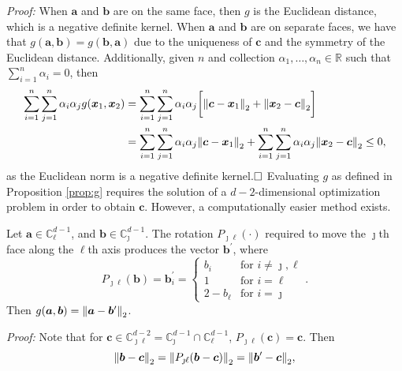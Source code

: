 {\em Proof:}
When $\bm{a}$ and $\bm{b}$ are on the same face, then $g$ is the Euclidean distance, which is a 
  negative definite kernel.  When $\bm{a}$ and $\bm{b}$ are on separate
  faces, we have that $g(\bm{a}, \bm{b}) = g(\bm{b}, \bm{a})$ due to the uniqueness of $\bm{c}$ and the symmetry of the Euclidean distance. Additionally, given $n$ and  collection $\alpha_1,\ldots,\alpha_n\in{\mathbb R}$ such that  $\sum_{i = 1}^n\alpha_i = 0$, then
  \begin{equation*}
    \begin{aligned}
      \sum_{i = 1}^n\sum_{j = 1}^n \alpha_i\alpha_j g(\bm{x}_1,\bm{x}_2) &= \sum_{i = 1}^n\sum_{j = 1}^n \alpha_i\alpha_j \bigg[\pnorm{\bm{c} - \bm{x}_1}{2} + \pnorm{\bm{x}_2 - \bm{c}}{2}\bigg]\\
      &= \sum_{i = 1}^n\sum_{j = 1}^n \alpha_i\alpha_j\pnorm{\bm{c} - \bm{x}_1}{2} + \sum_{i = 1}^n\sum_{j = 1}^n \alpha_i\alpha_j\pnorm{\bm{x}_2 - \bm{c}}{2} \leq0,
    \end{aligned}
  \end{equation*}
  as the Euclidean norm is a negative definite kernel.$\hfill\Box$
Evaluating $g$ as defined in Proposition \ref{prop:g} requires the solution of a $d-2$-dimensional 
  optimization problem in order to obtain $\bm{c}$.  However, a computationally easier  method exists.
\begin{prop}
    Let $\bm{a} \in {\mathbb C}_{\ell}^{d-1}$, and $\bm{b} \in {\mathbb C}_{\jmath}^{d-1}$.  The 
  rotation $P_{\jmath\ell}(\cdot)$ required to move the $\jmath$th face along the $\ell$th axis 
  produces the vector $\bm{b}^\prime$, where
  \begin{equation}
    \label{eqn:rotation}
    P_{\jmath\ell}(\bm{b}) = \bm{b}^{\prime}_i = 
    \begin{cases}
        b_{i} &\text{for }i\neq \jmath,\ell\\
        1 &\text{for }i = \ell\\
        2 - b_{\ell} &\text{for }i = \jmath
    \end{cases}.
  \end{equation}
  Then $g(\bm{a},\bm{b}) = \pnorm{\bm{a} - \bm{b}^{\prime}}{2}$.
\end{prop}
{\em Proof:}
Note that for 
  $\bm{c} \in {\mathbb C}_{\jmath\ell}^{d-2} = {\mathbb C}_{\jmath}^{d-1}\cap{\mathbb C}_{\ell}^{d-1}$,
  $P_{\jmath\ell}(\bm{c}) = \bm{c}$.  Then
  \begin{equation*}
     \pnorm{\bm{b} - \bm{c}}{2} = \pnorm{P_{\jmath\ell}(\bm{b} - \bm{c})}{2} = \pnorm{\bm{b}^{\prime} - \bm{c}}{2},
  \end{equation*}
